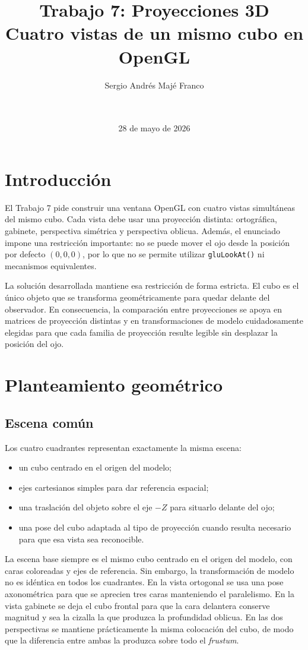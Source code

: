 \documentclass[12pt,a4paper]{article}
\title{\textbf{Trabajo 7: Proyecciones 3D}\\Cuatro vistas de un mismo cubo en OpenGL}
\author{Sergio Andrés Majé Franco}
\date{\Asignatura \\ \Universidad \\ 28 de mayo de 2026}
\begin{document}
\maketitle
\tableofcontents
\newpage

\section{Introducción}
El Trabajo 7 pide construir una ventana OpenGL con cuatro vistas simultáneas del mismo cubo. Cada vista debe usar una proyección distinta: ortográfica, gabinete, perspectiva simétrica y perspectiva oblicua. Además, el enunciado impone una restricción importante: no se puede mover el ojo desde la posición por defecto $(0,0,0)$, por lo que no se permite utilizar \texttt{gluLookAt()} ni mecanismos equivalentes.

La solución desarrollada mantiene esa restricción de forma estricta. El cubo es el único objeto que se transforma geométricamente para quedar delante del observador. En consecuencia, la comparación entre proyecciones se apoya en matrices de proyección distintas y en transformaciones de modelo cuidadosamente elegidas para que cada familia de proyección resulte legible sin desplazar la posición del ojo.

\section{Planteamiento geométrico}
\subsection{Escena común}
Los cuatro cuadrantes representan exactamente la misma escena:

\begin{itemize}[leftmargin=*]
    \item un cubo centrado en el origen del modelo;
    \item ejes cartesianos simples para dar referencia espacial;
    \item una traslación del objeto sobre el eje $-Z$ para situarlo delante del ojo;
    \item una pose del cubo adaptada al tipo de proyección cuando resulta necesario para que esa vista sea reconocible.
\end{itemize}

La escena base siempre es el mismo cubo centrado en el origen del modelo, con caras coloreadas y ejes de referencia. Sin embargo, la transformación de modelo no es idéntica en todos los cuadrantes. En la vista ortogonal se usa una pose axonométrica para que se aprecien tres caras manteniendo el paralelismo. En la vista gabinete se deja el cubo frontal para que la cara delantera conserve magnitud y sea la cizalla la que produzca la profundidad oblicua. En las dos perspectivas se mantiene prácticamente la misma colocación del cubo, de modo que la diferencia entre ambas la produzca sobre todo el \emph{frustum}.
\end{document}
